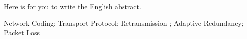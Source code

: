 
\eabstract
{
Here is for you to write the English abstract.



}
{Network Coding; Transport Protocol; Retransmission ; Adaptive Redundancy; Packet Loss}	%